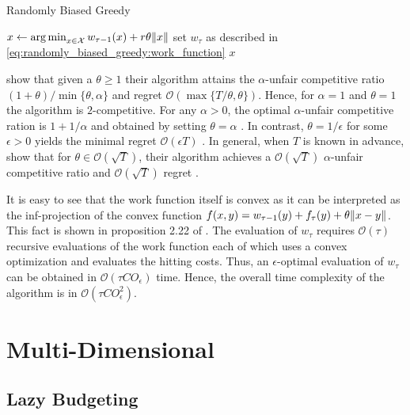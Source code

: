 \begin{algorithm}
    \caption{Randomly Biased Greedy \cite{Andrew2015}}\label{alg:ud:rbg}
    $x \gets \operatorname*{arg\,min}_{x \in \mathcal{X}} w_{\tau-1}(x) + r \theta \lVert x\rVert$\;
    set $w_{\tau}$ as described in \autoref{eq:randomly_biased_greedy:work_function}\;
    \Return $x$\;
\end{algorithm}

\citeauthor*{Andrew2015} show that given a $\theta \geq 1$ their algorithm attains the $\alpha$-unfair competitive ratio $(1+\theta) / \min \{\theta, \alpha\}$ and regret $\mathcal{O}(\max \{T / \theta, \theta\})$. Hence, for $\alpha = 1$ and $\theta = 1$ the algorithm is $2$-competitive. For any $\alpha > 0$, the optimal $\alpha$-unfair competitive ration is $1 + 1 / \alpha$ and obtained by setting $\theta = \alpha$ \cite{Andrew2015}. In contrast, $\theta = 1 / \epsilon$ for some $\epsilon > 0$ yields the minimal regret $\mathcal{O}(\epsilon T)$ \cite{Andrew2015}. In general, when $T$ is known in advance, \citeauthor*{Andrew2015} show that for $\theta \in \mathcal{O}(\sqrt{T})$, their algorithm achieves a $\mathcal{O}(\sqrt{T})$ $\alpha$-unfair competitive ratio and $\mathcal{O}(\sqrt{T})$ regret \cite{Andrew2015}.

It is easy to see that the work function itself is convex as it can be interpreted as the inf-projection of the convex function $f(x,y) = w_{\tau-1}(y) + f_{\tau}(y) + \theta \lVert x - y\rVert$. This fact is shown in proposition 2.22 of \cite{Burke2015}. The evaluation of $w_{\tau}$ requires $\mathcal{O}(\tau)$ recursive evaluations of the work function each of which uses a convex optimization and evaluates the hitting costs. Thus, an $\epsilon$-optimal evaluation of $w_{\tau}$ can be obtained in $\mathcal{O}(\tau C O_{\epsilon})$ time. Hence, the overall time complexity of the algorithm is in $\mathcal{O}(\tau C O_{\epsilon}^2)$.

\section{Multi-Dimensional}\label{section:online_algorithms:md}

\subsection{Lazy Budgeting}\label{section:online_algorithms:md:lazy_budgeting}

